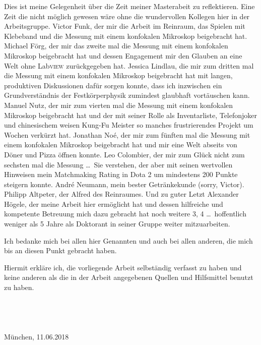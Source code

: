 
Dies ist meine Gelegenheit über die Zeit meiner Masterabeit zu reflektieren. Eine Zeit die nicht möglich gewesen wäre ohne die wundervollen Kollegen hier in der Arbeitsgruppe. Victor Funk, der mir die Arbeit im Reinraum, das Spielen mit Klebeband und die Messung mit einem konfokalen Mikroskop beigebracht hat. Michael Förg, der mir das zweite mal die Messung mit einem konfokalen Mikroskop beigebracht hat und dessen Engagement mir den Glauben an eine Welt ohne Lab\textsc{view} zurückgegeben hat. Jessica Lindlau, die mir zum dritten mal die Messung mit einem konfokalen Mikroskop beigebracht hat mit langen, produktiven Diskussionen dafür sorgen konnte, dass ich inzwischen ein Grundverständnis der Festkörperphysik zumindest glaubhaft vortäuschen kann. Manuel Nutz, der mir zum vierten mal die Messung mit einem konfokalen Mikroskop beigebracht hat und der mit seiner Rolle als Inventarliste, Telefonjoker und chinesischem weisen Kung-Fu Meister so manches frustrierendes Projekt um Wochen verkürzt hat. Jonathan Noé, der mir zum fünften mal die Messung mit einem konfokalen Mikroskop beigebracht hat und mir eine Welt abseits von Döner und Pizza öffnen konnte. Leo Colombier, der mir zum Glück nicht zum sechsten mal die Messung \dots\ Sie verstehen, der aber mit seinen wertvollen Hinweisen mein Matchmaking Rating in Dota 2 um mindestens 200 Punkte steigern konnte. André Neumann, mein bester Getränkekunde (sorry, Victor). Philipp Altpeter, der Alfred des Reinraumes. Und zu guter Letzt Alexander Högele, der meine Arbeit hier ermöglicht hat und dessen hilfreiche und kompetente Betreuung mich dazu gebracht hat noch weitere 3, 4 \dots\ hoffentlich weniger als 5 Jahre als Doktorant in seiner Gruppe weiter mitzuarbeiten.

Ich bedanke mich bei allen hier Genannten und auch bei allen anderen, die mich bis an diesen Punkt gebracht haben.


Hiermit erkläre ich, die vorliegende Arbeit selbständig verfasst zu haben und keine anderen als die in der Arbeit angegebenen Quellen und Hilfsmittel benutzt zu haben.
\\ \\ \\ \\ \\
München, 11.06.2018
